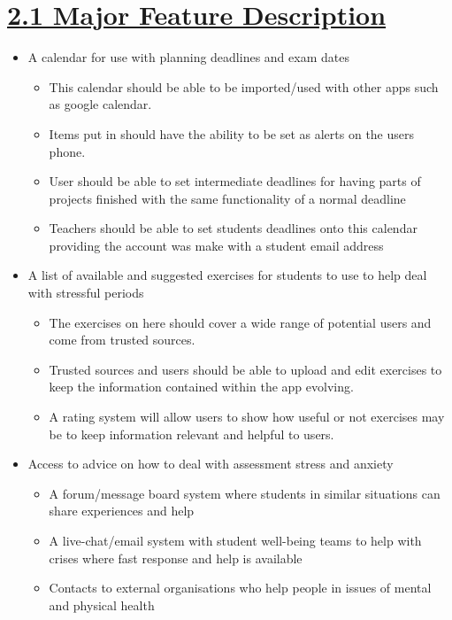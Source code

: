 \documentclass[a4paper]{article}
\begin{document}
\section*{\underline{2.1 Major Feature Description}}
\begin{itemize}
	\item A calendar for use with planning deadlines and exam dates
	\begin{itemize}
		\item This calendar should be able to be imported/used with other apps such as google calendar.
		\item Items put in should have the ability to be set as alerts on the users phone.
		\item User should be able to set intermediate deadlines for having parts of projects finished with the same functionality of a normal deadline
		\item Teachers should be able to set students deadlines onto this calendar providing the account was make with a student email address
	\end{itemize}
	
	\item A list of available and suggested exercises for students to use to help deal with stressful periods
	\begin{itemize}
		\item The exercises on here should cover a wide range of potential users and come from trusted sources.
		\item Trusted sources and users should be able to upload and edit exercises to keep the information contained within the app evolving.
		\item A rating system will allow users to show how useful or not exercises may be to keep information relevant and helpful to users.
	\end{itemize}
	
	\item Access to advice on how to deal with assessment stress and anxiety
	\begin{itemize}
		\item A forum/message board system where students in similar situations can share experiences and help
		\item A live-chat/email system with student well-being teams to help with crises where fast response and help is available
		\item Contacts to external organisations who help people in issues of mental and physical health
	\end{itemize}		
\end{itemize}
\end{document}

